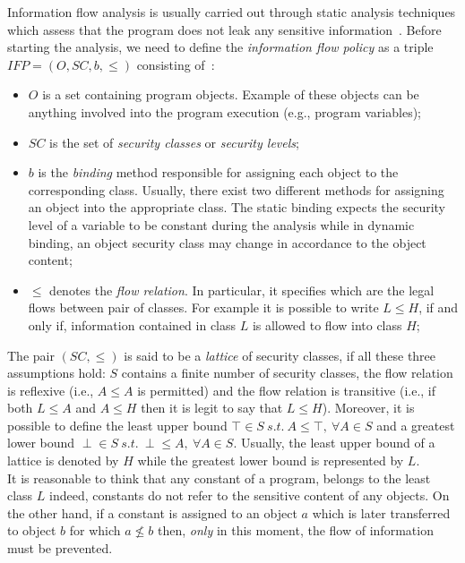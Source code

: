 \documentclass[LaM,binding=0.6cm]{sapthesis}
\begin{document}
Information flow analysis is usually carried out through static analysis techniques which assess that the program does not leak any sensitive information~\cite{smith2007principles}. Before starting the analysis, we need to define the \textit{information flow policy} as a triple $IFP = (O, SC, b, \leq)$ consisting of~\cite{denning1977certification}:
\begin{itemize}
\item $O$ is a set containing program objects. Example of these objects can be anything involved into the program execution (e.g., program variables);
\item $SC$ is the set of \textit{security classes} or \textit{security levels};
\item $b$ is the \textit{binding} method responsible for assigning each object to the corresponding class. Usually, there exist two different methods for assigning an object into the appropriate class. The static binding expects the security level of a variable to be constant during the analysis while in dynamic binding, an object security class may change in accordance to the object content;
\item $\leq$ denotes the \textit{flow relation}. In particular, it specifies which are the legal flows between pair of classes. For example it is possible to write $L \leq H$, if and only if, information contained in class $L$ is allowed to flow into class $H$;
\end{itemize}
The pair $(SC, \leq)$ is said to be a \textit{lattice} of security classes, if all these three assumptions hold: $S$ contains a finite number of security classes, the flow relation is reflexive (i.e., $A \leq A$ is permitted) and the flow relation is transitive (i.e., if both $L \leq A$ and $A \leq H$ then it is legit to say that $L \leq H$). Moreover, it is possible to define the least upper bound $\top \in S \ s.t. \ A \leq \top, \ \forall A \in S$ and a greatest lower bound $\perp \in S \ s.t. \ \perp \leq A, \ \forall A \in S$. Usually, the least upper bound of a lattice is denoted by $H$ while the greatest lower bound is represented by $L$.\\
It is reasonable to think that any constant of a program, belongs to the least class $L$ indeed, constants do not refer to the sensitive content of any objects. On the other hand, if a constant is assigned to an object $a$ which is later transferred to object $b$ for which $a \nleq b$ then, \textit{only} in this moment, the flow of information must be prevented.\\
\end{document}
